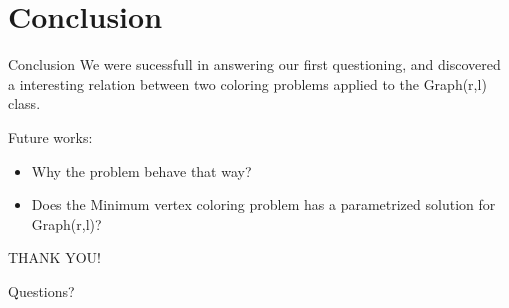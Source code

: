 \documentclass[9pt, compress]{beamer}
\begin{document}
    \section{Conclusion}
    \begin{frame}{Conclusion}
       We were sucessfull in answering our first questioning, and discovered a interesting relation between two coloring problems applied to the Graph(r,l) class.
       
       Future works:
       \begin{itemize}
         \item Why the problem behave that way?
         \item Does the Minimum vertex coloring problem has a parametrized solution for Graph(r,l)?
       \end{itemize}
     \end{frame}
     \begin{frame}[standout]
       THANK YOU!
       
       Questions?
     \end{frame}
\end{document}
